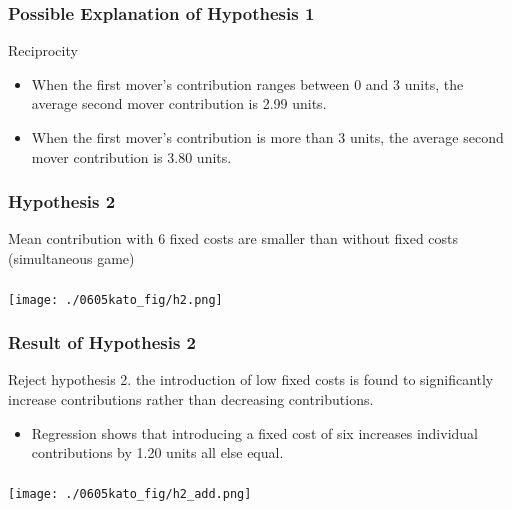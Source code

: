 \documentclass[unicode,12pt]{beamer}
\begin{document}
    \begin{frame}
        \frametitle{Possible Explanation of Hypothesis 1}
    
        Reciprocity
        \begin{itemize}
            \item When the first mover's contribution ranges between 0 and 3 units, the average second mover contribution is 2.99 units.
            \item When the first mover's contribution is more than 3 units, the average second mover contribution is 3.80 units.
        \end{itemize}
    
    \end{frame}

    \begin{frame}
        \frametitle{Hypothesis 2}
    
        Mean contribution with 6 fixed costs are smaller than without fixed costs (simultaneous game)
    
    \end{frame}

    \begin{frame}
        \frametitle{}
    
        \centerline{\texttt{[image: ./0605kato\_fig/h2.png]}}
    
    \end{frame}

    \begin{frame}
        \frametitle{Result of Hypothesis 2}
    
        Reject hypothesis 2. the introduction of low fixed costs is found to significantly increase contributions rather than decreasing contributions.
        \begin{itemize}
            \item Regression shows that introducing a fixed cost of six increases individual contributions by 1.20 units all else equal.
        \end{itemize}
    
    \end{frame}

    \begin{frame}
        \frametitle{}
    
        \centerline{\texttt{[image: ./0605kato\_fig/h2\_add.png]}}
    
    \end{frame}
\end{document}

